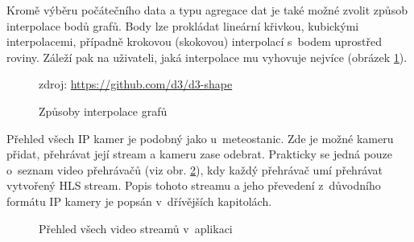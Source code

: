 Kromě výběru počátečního data a typu agregace dat je také možné zvolit způsob interpolace bodů grafů. Body lze prokládat lineární křivkou, kubickými interpolacemi, případně krokovou (skokovou) interpolací s~bodem uprostřed roviny. Záleží pak na uživateli, jaká interpolace mu vyhovuje nejvíce (obrázek \ref{fig:app:interpolation}).

\begin{figure}[h]
	\centering
	\caption{Způsoby interpolace grafů}
	\small zdroj: \url{https://github.com/d3/d3-shape}
	\label{fig:app:interpolation}
\end{figure}

Přehled všech IP kamer je podobný jako u~meteostanic. Zde je možné kameru přidat, přehrávat její stream a kameru zase odebrat. Prakticky se jedná pouze o~seznam video přehrávačů (viz obr. \ref{fig:app:cameras}), kdy každý přehrávač umí přehrávat vytvořený HLS stream. Popis tohoto streamu a jeho převedení z~důvodního formátu IP kamery je popsán v~dřívějších kapitolách.

\begin{figure}[h]
	\centering
	\caption{Přehled všech video streamů v~aplikaci}
	\label{fig:app:cameras}
\end{figure}


